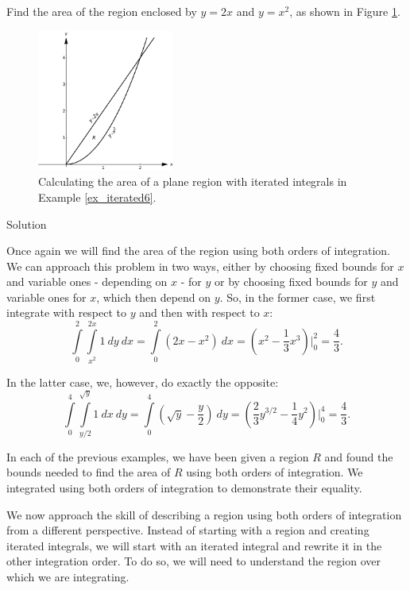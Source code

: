 \begin{example}\label{ex_iterated6}
Find the area of the region enclosed by $y=2x$ and $y=x^2$, as shown in Figure \ref{fig_double_3}. 



\begin{figure}[H]
	\begin{center}
			\includegraphics[width=0.4\textwidth]{fig_double_3}
	\caption{Calculating the area of a plane region with iterated integrals in Example \ref{ex_iterated6}.}
	\label{fig_double_3}
	\end{center}
\end{figure}

Solution 

Once again we will find the area of the region using both orders of integration. We can approach this problem in two ways, either by choosing  fixed bounds for $x$ and variable ones - depending on $x$ - for $y$ or by choosing fixed bounds for $y$ and variable ones for $x$, which then depend on $y$. So, in the former case, we first integrate with respect to $y$ and then with respect to $x$:
$$\int\limits_0^2\int\limits_{x^2}^{2x}1\ dy \ dx = \int\limits_0^2(2x-x^2)\ dx = \left(x^2-\frac13x^3\right)\Bigg|_0^2 = \frac43.$$

In the latter case, we, however, do exactly the opposite:
$$\int\limits_0^4\int\limits_{y/2}^{\sqrt{y}} 1\ dx\ dy = \int\limits_0^4 \left(\sqrt{y}-\dfrac{y}{2} \right)\ dy = \left(\frac23y^{3/2} - \frac14y^2\right)\Big|_0^4 = \frac43.$$
\end{example}


In each of the previous examples, we have been given a region $R$ and found the bounds needed to find the area of $R$ using both orders of integration. We integrated using both orders of integration to demonstrate their equality.

We now approach the skill of describing a region using both orders of integration from a different perspective. Instead of starting with a region and creating iterated integrals, we will start with an iterated integral and rewrite it in the other integration order. To do so, we will need to understand the region over which we are integrating.

